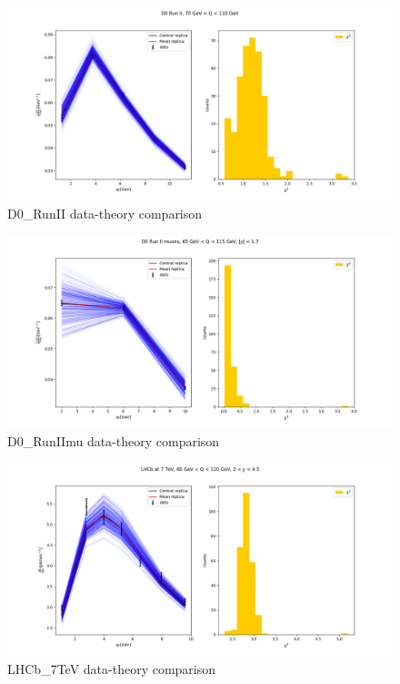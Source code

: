 \documentclass[
]{article}
\begin{document}
\begin{figure}
\centering
\includegraphics{pngplots/D0_RunII.png}
\caption{D0\_RunII data-theory comparison}
\end{figure}

\begin{figure}
\centering
\includegraphics{pngplots/D0_RunIImu.png}
\caption{D0\_RunIImu data-theory comparison}
\end{figure}

\begin{figure}
\centering
\includegraphics{pngplots/LHCb_7TeV.png}
\caption{LHCb\_7TeV data-theory comparison}
\end{figure}
\end{document}
